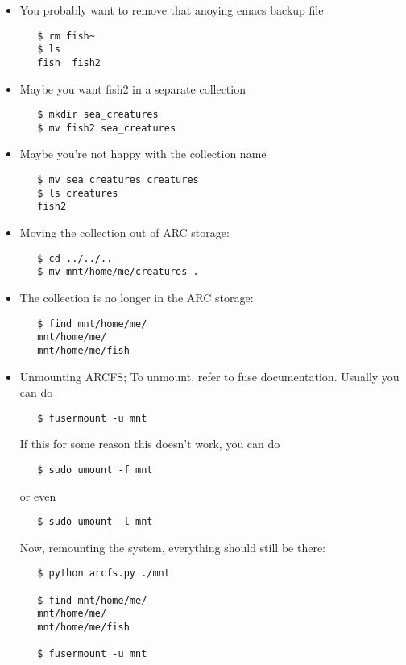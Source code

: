 \documentclass{article}
\begin{document}
\begin{itemize}
\item You probably want to remove that anoying emacs backup file
\begin{verbatim}   
   $ rm fish~
   $ ls 
   fish  fish2
\end{verbatim}

\item Maybe you want fish2 in a separate collection
\begin{verbatim}   
   $ mkdir sea_creatures
   $ mv fish2 sea_creatures
\end{verbatim}

\item Maybe you're not happy with the collection name
\begin{verbatim}
   $ mv sea_creatures creatures
   $ ls creatures
   fish2
\end{verbatim}

\item Moving the collection out of ARC storage:
\begin{verbatim}
   $ cd ../../..
   $ mv mnt/home/me/creatures .
\end{verbatim}

\item The collection is no longer in the ARC storage:
\begin{verbatim}
   $ find mnt/home/me/
   mnt/home/me/
   mnt/home/me/fish
\end{verbatim}

\item Unmounting ARCFS; To unmount, refer to fuse documentation. Usually you can do
\begin{verbatim}   
   $ fusermount -u mnt
\end{verbatim}

If this for some reason this doesn't work, you can do
\begin{verbatim}   
   $ sudo umount -f mnt
\end{verbatim}   

or even
\begin{verbatim}   
   $ sudo umount -l mnt
\end{verbatim}   

Now, remounting the system, everything should still be there:
\begin{verbatim}
   $ python arcfs.py ./mnt

   $ find mnt/home/me/
   mnt/home/me/
   mnt/home/me/fish

   $ fusermount -u mnt
\end{verbatim}
\end{itemize}
\end{document}
